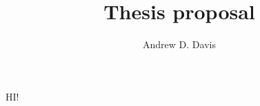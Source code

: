 \documentclass[12pt]{article}
\title{Thesis proposal}
\author{Andrew D. Davis}
\begin{document}
\maketitle

\tableofcontents

\begin{abstract}
%
\end{abstract}

HI!

%
%

\newpage

\appendix

\newpage
\end{document}
